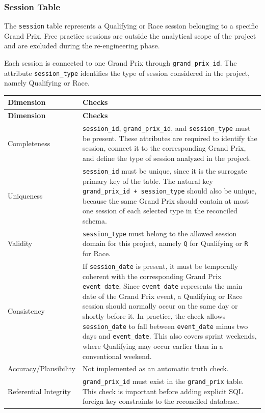 \documentclass[a4paper,11pt]{article}
\begin{document}
	
	\subsubsection{Session Table}
	
	The \texttt{session} table represents a Qualifying or Race session belonging to
	a specific Grand Prix. Free practice sessions are outside the analytical scope of
	the project and are excluded during the re-engineering phase.
	
	Each session is connected to one Grand Prix through \texttt{grand\_prix\_id}. The
	attribute \texttt{session\_type} identifies the type of session considered in the
	project, namely Qualifying or Race.
	
	\begin{longtable}{p{3.5cm}p{11cm}}
		\toprule
		\textbf{Dimension} & \textbf{Checks} \\
		\midrule
		\endfirsthead
		
		\toprule
		\textbf{Dimension} & \textbf{Checks} \\
		\midrule
		\endhead
		
		Completeness
		& \texttt{session\_id}, \texttt{grand\_prix\_id}, and
		\texttt{session\_type} must be present. These attributes are required to
		identify the session, connect it to the corresponding Grand Prix, and define
		the type of session analyzed in the project. \\
		\midrule
		
		Uniqueness
		& \texttt{session\_id} must be unique, since it is the surrogate primary key
		of the table. The natural key \texttt{grand\_prix\_id + session\_type} should
		also be unique, because the same Grand Prix should contain at most one
		session of each selected type in the reconciled schema. \\
		\midrule
		
		Validity
		& \texttt{session\_type} must belong to the allowed session domain for this
		project, namely \texttt{Q} for Qualifying or \texttt{R} for Race. \\
		\midrule
		
		Consistency
		& If \texttt{session\_date} is present, it must be temporally coherent with
		the corresponding Grand Prix \texttt{event\_date}. Since \texttt{event\_date}
		represents the main date of the Grand Prix event, a Qualifying or Race session
		should normally occur on the same day or shortly before it. In practice, the
		check allows \texttt{session\_date} to fall between \texttt{event\_date} minus
		two days and \texttt{event\_date}. This also covers sprint weekends, where
		Qualifying may occur earlier than in a conventional weekend. \\
		\midrule
		
		Accuracy/Plausibility
		& Not implemented as an automatic truth check.  \\
		\midrule
		
		Referential Integrity
		& \texttt{grand\_prix\_id} must exist in the \texttt{grand\_prix} table. This
		check is important before adding explicit SQL foreign key constraints to the
		reconciled database. \\
		\bottomrule
	\end{longtable}
\end{document}
